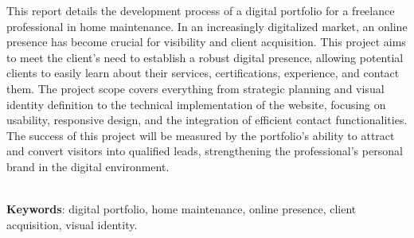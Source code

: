 \begin{thesisabastract}
This report details the development process of a digital portfolio for a freelance professional in home maintenance. In an increasingly digitalized market, an online presence has become crucial for visibility and client acquisition. This project aims to meet the client's need to establish a robust digital presence, allowing potential clients to easily learn about their services, certifications, experience, and contact them. The project scope covers everything from strategic planning and visual identity definition to the technical implementation of the website, focusing on usability, responsive design, and the integration of efficient contact functionalities. The success of this project will be measured by the portfolio's ability to attract and convert visitors into qualified leads, strengthening the professional's personal brand in the digital environment.


\ \\


\textbf{Keywords}: digital portfolio, home maintenance, online presence, client acquisition, visual identity.

\end{thesisabastract}

